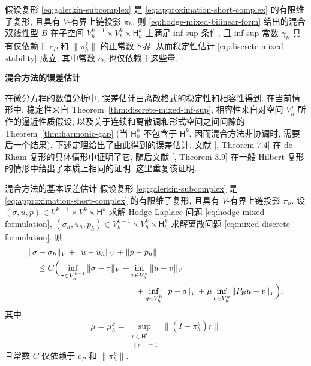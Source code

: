 \begin{Theorem}\label{thm:discrete-mixed-inf-sup}
{假设复形 \eqref{eq:galerkin-subcomplex} 是 \eqref{eq:approximation-short-complex} 的有限维子复形, 且具有 $V$-有界上链投影 $\pi_h$. 则 \eqref{eq:hodge-mixed-bilinear-form} 给出的混合双线性型 $B$ 在子空间 $V_h^{k-1}\times V_h^k\times\mathsf H_h^k$ 上满足 inf-sup 条件, 且 inf-sup 常数 $\gamma_h$ 具有仅依赖于 $c_P$ 和 $\|\pi_h^k\|$ 的正常数下界. 从而稳定性估计 \eqref{eq:discrete-mixed-stability} 成立, 其中常数 $c_h$ 也仅依赖于这些量.}
\end{Theorem}

\medskip\noindent\textbf{{混合方法的误差估计}}\par
{在微分方程的数值分析中, 误差估计由离散格式的稳定性和相容性得到. 在当前情形中, 稳定性来自 Theorem~\ref{thm:discrete-mixed-inf-sup}, 相容性来自对空间 $V_h^j$ 所作的逼近性质假设, 以及关于连续和离散调和形式空间之间间隙的 Theorem~\ref{thm:harmonic-gap} (当 $\mathsf H_h^k$ 不包含于 $\mathsf H^k$, 因而混合方法非协调时, 需要后一个结果). 下述定理给出了由此得到的误差估计. 文献 [, Theorem 7.4] 在 de Rham 复形的具体情形中证明了它, 随后文献 [, Theorem 3.9] 在一般 Hilbert 复形的情形中给出了本质上相同的证明. 这里重复该证明.}

\begin{Theorem}{{混合方法的基本误差估计}}\label{thm:mixed-basic-error}
{假设复形 \eqref{eq:galerkin-subcomplex} 是 \eqref{eq:approximation-short-complex} 的有限维子复形, 且具有 $V$-有界上链投影 $\pi_h$. 设 $(\sigma,u,p)\in V^{k-1}\times V^k\times\mathsf H^k$ 求解 Hodge Laplace 问题 \eqref{eq:hodge-mixed-formulation}, $(\sigma_h,u_h,p_h)\in V_h^{k-1}\times V_h^k\times\mathsf H_h^k$ 求解离散问题 \eqref{eq:mixed-discrete-formulation}. 则}
\[
\begin{aligned}
&\|\sigma-\sigma_h\|_V+\|u-u_h\|_V+\|p-p_h\|\\
&\quad\leq C\Big(\inf_{\tau\in V_h^{k-1}}\|\sigma-\tau\|_V+\inf_{v\in V_h^k}\|u-v\|_V\\
&\hspace{45mm}+\inf_{q\in V_h^k}\|p-q\|_V+\mu\inf_{v\in V_h^k}\|P_{\mathcal B}u-v\|_V\Big),
\end{aligned}
\]
{其中}
\[
\mu=\mu_h^k=\sup_{\substack{r\in\mathsf H^k\\\|r\|=1}}\|(I-\pi_h^k)r\|
\]
{且常数 $C$ 仅依赖于 $c_P$ 和 $\|\pi_h^k\|$.}
\end{Theorem}

